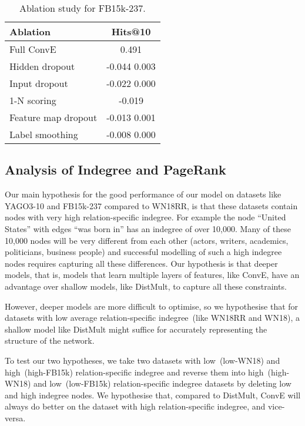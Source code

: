 \documentclass[letterpaper]{article}
\begin{document}
\begin{center}
\begin{table}[t]
	\caption{Ablation study for FB15k-237.}
\label{ablation_study}
\begin{center}
\begin{tabular}{lc}
    \toprule       
	Ablation & Hits@10 \\
	\midrule	    
    Full ConvE & 0.491	\\
	\midrule	    
    Hidden dropout & -0.044  0.003\\
    Input dropout & -0.022  0.000	\\
    1-N scoring & -0.019	\\
    Feature map dropout & -0.013  0.001	\\
    Label smoothing & -0.008  0.000	\\
	\bottomrule
\end{tabular}
\end{center}
\end{table}
\end{center}

\subsection{Analysis of Indegree and PageRank}


Our main hypothesis for the good performance of our model on datasets like YAGO3-10 and FB15k-237 compared to WN18RR, is that these datasets contain nodes with very high relation-specific indegree.
For example the node ``United States'' with edges ``was born in'' has an indegree of over 10,000.
Many of these 10,000 nodes will be very different from each other (actors, writers, academics, politicians, business people) and successful modelling of such a high indegree nodes requires capturing all these differences.
Our hypothesis is that deeper models, that is, models that learn multiple layers of features, like ConvE, have an advantage over shallow models, like DistMult, to capture all these constraints.


However, deeper models are more difficult to optimise, so we hypothesise that for datasets with low average relation-specific indegree~(like WN18RR and WN18), a shallow model like DistMult might suffice for accurately representing the structure of the network.


To test our two hypotheses, we take two datasets with low~(low-WN18) and high~(high-FB15k) relation-specific indegree and reverse them into high~(high-WN18) and low~(low-FB15k) relation-specific indegree datasets by deleting low and high indegree nodes. 
We hypothesise that, compared to DistMult, ConvE will always do better on the dataset with high relation-specific indegree, and vice-versa.
\end{document}
